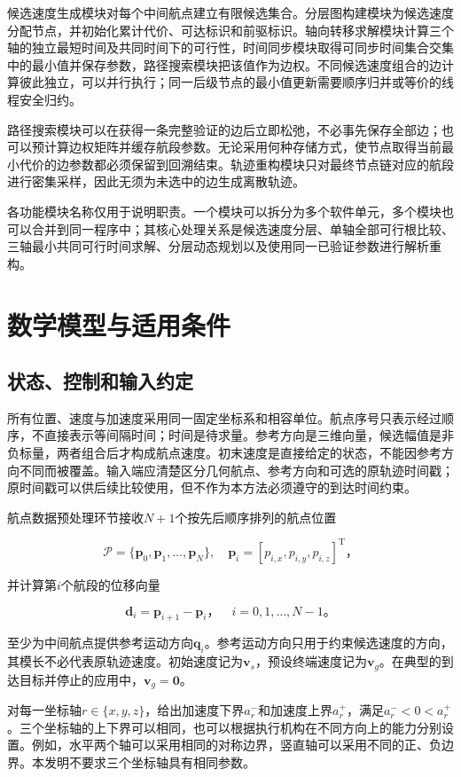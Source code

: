 \documentclass[UTF8,a4paper,12pt,fontset=fandol]{ctexart}
\begin{document}
候选速度生成模块对每个中间航点建立有限候选集合。分层图构建模块为候选速度分配节点，并初始化累计代价、可达标识和前驱标识。轴向转移求解模块计算三个轴的独立最短时间及共同时间下的可行性，时间同步模块取得可同步时间集合交集中的最小值并保存参数，路径搜索模块把该值作为边权。不同候选速度组合的边计算彼此独立，可以并行执行；同一后级节点的最小值更新需要顺序归并或等价的线程安全归约。

路径搜索模块可以在获得一条完整验证的边后立即松弛，不必事先保存全部边；也可以预计算边权矩阵并缓存航段参数。无论采用何种存储方式，使节点取得当前最小代价的边参数都必须保留到回溯结束。轨迹重构模块只对最终节点链对应的航段进行密集采样，因此无须为未选中的边生成离散轨迹。

各功能模块名称仅用于说明职责。一个模块可以拆分为多个软件单元，多个模块也可以合并到同一程序中；其核心处理关系是候选速度分层、单轴全部可行根比较、三轴最小共同可行时间求解、分层动态规划以及使用同一已验证参数进行解析重构。

\section{数学模型与适用条件}

\subsection{状态、控制和输入约定}

所有位置、速度与加速度采用同一固定坐标系和相容单位。航点序号只表示经过顺序，不直接表示等间隔时间；时间是待求量。参考方向是三维向量，候选幅值是非负标量，两者组合后才构成航点速度。初末速度是直接给定的状态，不能因参考方向不同而被覆盖。输入端应清楚区分几何航点、参考方向和可选的原轨迹时间戳；原时间戳可以供后续比较使用，但不作为本方法必须遵守的到达时间约束。

航点数据预处理环节接收\(N+1\)个按先后顺序排列的航点位置

\[
\mathcal P=\{\mathbf p_0,\mathbf p_1,\ldots,\mathbf p_N\},
\quad \mathbf p_i=[p_{i,x},p_{i,y},p_{i,z}]^\mathrm T\text{，}
\]

并计算第\(i\)个航段的位移向量

\[
\mathbf d_i=\mathbf p_{i+1}-\mathbf p_i\text{，}\quad i=0,1,\ldots,N-1\text{。}
\]

至少为中间航点提供参考运动方向\(\mathbf q_i\)。参考运动方向只用于约束候选速度的方向，其模长不必代表原轨迹速度。初始速度记为\(\mathbf v_s\)，预设终端速度记为\(\mathbf v_g\)。在典型的到达目标并停止的应用中，\(\mathbf v_g=\mathbf 0\)。

对每一坐标轴\(r\in\{x,y,z\}\)，给出加速度下界\(a_r^-\)和加速度上界\(a_r^+\)，满足\(a_r^-<0<a_r^+\)。三个坐标轴的上下界可以相同，也可以根据执行机构在不同方向上的能力分别设置。例如，水平两个轴可以采用相同的对称边界，竖直轴可以采用不同的正、负边界。本发明不要求三个坐标轴具有相同参数。
\end{document}
